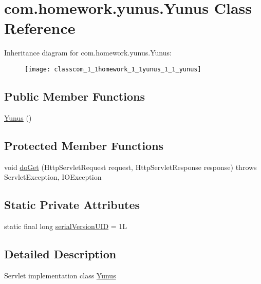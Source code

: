 \hypertarget{classcom_1_1homework_1_1yunus_1_1_yunus}{}\section{com.\+homework.\+yunus.\+Yunus Class Reference}
\label{classcom_1_1homework_1_1yunus_1_1_yunus}
Inheritance diagram for com.\+homework.\+yunus.\+Yunus\+:\begin{figure}[H]
\begin{center}
\leavevmode
\texttt{[image: classcom\_1\_1homework\_1\_1yunus\_1\_1\_yunus]}
\end{center}
\end{figure}
\subsection*{Public Member Functions}
\begin{DoxyCompactItemize}
\item 
\hyperlink{classcom_1_1homework_1_1yunus_1_1_yunus_a9d5871f9e874380b129c6dff31f1531b}{Yunus} ()
\end{DoxyCompactItemize}
\subsection*{Protected Member Functions}
\begin{DoxyCompactItemize}
\item 
void \hyperlink{classcom_1_1homework_1_1yunus_1_1_yunus_a2653e3f269da80881e2abfa6b30dc708}{do\+Get} (Http\+Servlet\+Request request, Http\+Servlet\+Response response)  throws Servlet\+Exception, I\+O\+Exception 
\end{DoxyCompactItemize}
\subsection*{Static Private Attributes}
\begin{DoxyCompactItemize}
\item 
static final long \hyperlink{classcom_1_1homework_1_1yunus_1_1_yunus_a135ed76b5ead6a58aa5f941be9477ed1}{serial\+Version\+U\+ID} = 1L
\end{DoxyCompactItemize}


\subsection{Detailed Description}
Servlet implementation class \hyperlink{classcom_1_1homework_1_1yunus_1_1_yunus}{Yunus} 

